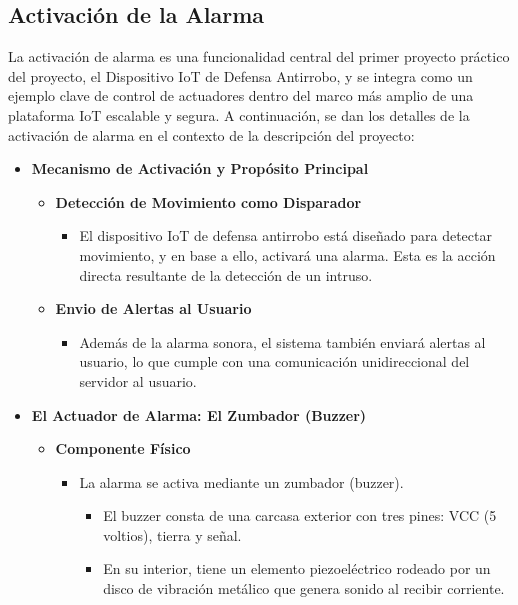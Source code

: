 \documentclass{report}
\begin{document}
\subsection{Activación de la Alarma}
La activación de alarma es una funcionalidad central del primer proyecto práctico del proyecto, el Dispositivo IoT de Defensa Antirrobo, y se integra como un 
ejemplo clave de control de actuadores dentro del marco más amplio de una plataforma IoT escalable y segura.
A continuación, se dan los detalles de la activación de alarma en el contexto de la descripción del proyecto:
\begin{itemize}
    \item \textbf{Mecanismo de Activación y Propósito Principal}
    \begin{itemize}
        \item \textbf{Detección de Movimiento como Disparador}
        \begin{itemize}
            \item El dispositivo IoT de defensa antirrobo está diseñado para detectar movimiento, y en base a ello, activará una alarma. Esta es la acción 
            directa resultante de la detección de un intruso.
        \end{itemize}

        \item \textbf{Envio de Alertas al Usuario}
        \begin{itemize}
            \item Además de la alarma sonora, el sistema también enviará alertas al usuario, lo que cumple con una comunicación unidireccional del servidor al 
            usuario.
        \end{itemize}
    \end{itemize}

    \item \textbf{El Actuador de Alarma: El Zumbador (Buzzer)}
    \begin{itemize}
        \item \textbf{Componente Físico}
        \begin{itemize}
            \item La alarma se activa mediante un zumbador (buzzer).
            \begin{itemize}
                \item El buzzer consta de una carcasa exterior con tres pines: VCC (5 voltios), tierra y señal.
                \item En su interior, tiene un elemento piezoeléctrico rodeado por un disco de vibración metálico que genera sonido al recibir corriente.
            \end{itemize}
        \end{itemize}


\end{itemize}
\end{itemize}
\end{document}
